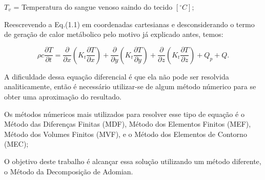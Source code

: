       $T_{v}$ = Temperatura do sangue venoso saindo do tecido $[^{\circ}C];$










  Reescrevendo a Eq.(1.1) em coordenadas cartesianas e desconsiderando o termo de geração de calor metábolico pelo motivo já explicado antes, temos:



  \begin{equation}\rho c\frac{\partial T}{\partial t} = \frac{\partial }{\partial x} \left (K_{t}\frac{\partial T}{\partial x}\right ) + \frac{\partial }{\partial y} \left(K_{t}\frac{\partial T}{\partial y}\right ) + \frac{\partial }{\partial z} \left (K_{t}\frac{\partial T}{\partial z}\right ) + Q_{p} + Q.\end{equation}
  
   A dificuldade dessa equação diferencial é que ela não pode ser resolvida analiticamente, então é necessário utilizar-se de algum método númerico para se obter uma aproximação do resultado.
   
   Os métodos númericos mais utilizados para resolver esse tipo de equação é o Método das Diferenças Finitas (MDF), Método dos Elementos Finitos (MEF), Método dos Volumes Finitos (MVF), e o Método dos Elementos de Contorno (MEC);
   
   O objetivo deste trabalho é alcançar essa solução  utilizando um método diferente, o Método da Decomposição de Adomian.
  
  





          
              